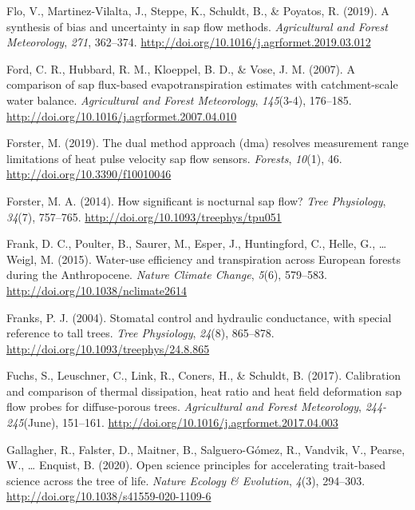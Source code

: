 \documentclass[11pt,twoside]{reedthesis}
\begin{document}
\hypertarget{ref-flo_synthesis_2019}{}
Flo, V., Martinez-Vilalta, J., Steppe, K., Schuldt, B., \& Poyatos, R.
(2019). A synthesis of bias and uncertainty in sap flow methods.
\emph{Agricultural and Forest Meteorology}, \emph{271}, 362--374.
\url{http://doi.org/10.1016/j.agrformet.2019.03.012}

\hypertarget{ref-Ford2007}{}
Ford, C. R., Hubbard, R. M., Kloeppel, B. D., \& Vose, J. M. (2007). A
comparison of sap flux-based evapotranspiration estimates with
catchment-scale water balance. \emph{Agricultural and Forest
Meteorology}, \emph{145}(3-4), 176--185.
\url{http://doi.org/10.1016/j.agrformet.2007.04.010}

\hypertarget{ref-Forster_2019}{}
Forster, M. (2019). The dual method approach (dma) resolves measurement
range limitations of heat pulse velocity sap flow sensors.
\emph{Forests}, \emph{10}(1), 46. \url{http://doi.org/10.3390/f10010046}

\hypertarget{ref-Forster2014}{}
Forster, M. A. (2014). How significant is nocturnal sap flow? \emph{Tree
Physiology}, \emph{34}(7), 757--765.
\url{http://doi.org/10.1093/treephys/tpu051}

\hypertarget{ref-Frank2015}{}
Frank, D. C., Poulter, B., Saurer, M., Esper, J., Huntingford, C.,
Helle, G., \ldots{} Weigl, M. (2015). Water-use efficiency and
transpiration across European forests during the Anthropocene.
\emph{Nature Climate Change}, \emph{5}(6), 579--583.
\url{http://doi.org/10.1038/nclimate2614}

\hypertarget{ref-Franks2004}{}
Franks, P. J. (2004). Stomatal control and hydraulic conductance, with
special reference to tall trees. \emph{Tree Physiology}, \emph{24}(8),
865--878. \url{http://doi.org/10.1093/treephys/24.8.865}

\hypertarget{ref-Fuchs2017}{}
Fuchs, S., Leuschner, C., Link, R., Coners, H., \& Schuldt, B. (2017).
Calibration and comparison of thermal dissipation, heat ratio and heat
field deformation sap flow probes for diffuse-porous trees.
\emph{Agricultural and Forest Meteorology}, \emph{244-245}(June),
151--161. \url{http://doi.org/10.1016/j.agrformet.2017.04.003}

\hypertarget{ref-Gallagher2020}{}
Gallagher, R., Falster, D., Maitner, B., Salguero-Gómez, R., Vandvik,
V., Pearse, W., \ldots{} Enquist, B. (2020). Open science principles for
accelerating trait-based science across the tree of life. \emph{Nature
Ecology \& Evolution}, \emph{4}(3), 294--303.
\url{http://doi.org/10.1038/s41559-020-1109-6}
\end{document}
